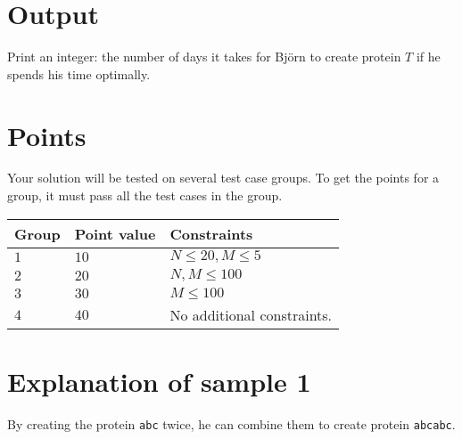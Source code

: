 \section*{Output}
Print an integer: the number of days it takes for Björn to create protein $T$ if he spends his time optimally.

\section*{Points}
Your solution will be tested on several test case groups.
To get the points for a group, it must pass all the test cases in the group.

\noindent
\begin{tabular}{| l | l | p{12cm} |}
  \hline
  \textbf{Group} & \textbf{Point value} & \textbf{Constraints} \\ \hline
  $1$    & $10$       & $N \leq 20, M \leq 5$ \\ \hline
  $2$    & $20$       & $N, M \leq 100$ \\ \hline
  $3$    & $30$       & $M \leq 100$ \\ \hline
  $4$    & $40$       & No additional constraints. \\ \hline
\end{tabular}

\section*{Explanation of sample 1}
By creating the protein \texttt{abc} twice, he can combine them to create protein \texttt{abcabc}.
